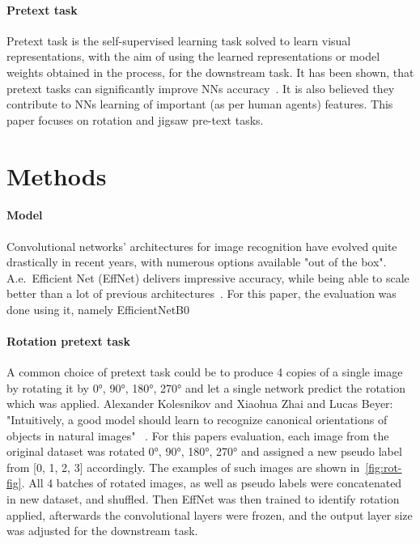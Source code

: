 \paragraph{Pretext task}
Pretext task is the self-supervised learning task solved to learn visual representations,
with the aim of using the learned representations or model weights obtained in the process, for the downstream task.
It has been shown, that pretext tasks can significantly improve NNs accuracy~\cite{kolesnikov2019revisiting}.
It is also believed they contribute to NNs learning of important (as per human agents) features.
This paper focuses on rotation and jigsaw pre-text tasks.


\section{Methods}

\paragraph{Model}
Convolutional networks' architectures for image recognition have evolved quite drastically in recent years,
with numerous options available "out of the box".
A.e.\ Efficient Net (EffNet) delivers impressive accuracy, while being able to scale better than a lot of
previous architectures~\cite{DBLP:journals/corr/abs-1905-11946}.
For this paper, the evaluation was done using it, namely EfficientNetB0~\cite{KerasEffNet}

\paragraph{Rotation pretext task}
A common choice of pretext task could be to produce 4 copies of
a single image by rotating it by {0°, 90°, 180°, 270°} and let a single network predict the rotation which was applied.
Alexander Kolesnikov and Xiaohua Zhai and Lucas Beyer: "Intuitively, a good model should learn to
recognize canonical orientations of objects in natural images" ~\cite{kolesnikov2019revisiting}.
For this papers evaluation, each image from the original dataset was rotated 0°, 90°, 180°,
270° and assigned a new pseudo label from [0, 1, 2, 3] accordingly.
The examples of such images are shown in~\ref{fig:rot-fig}.
All 4 batches of rotated images, as well as pseudo labels were concatenated in new dataset, and shuffled.
Then EffNet was then trained to identify rotation applied, afterwards the convolutional layers were frozen,
and the output layer size was adjusted for the downstream task.

